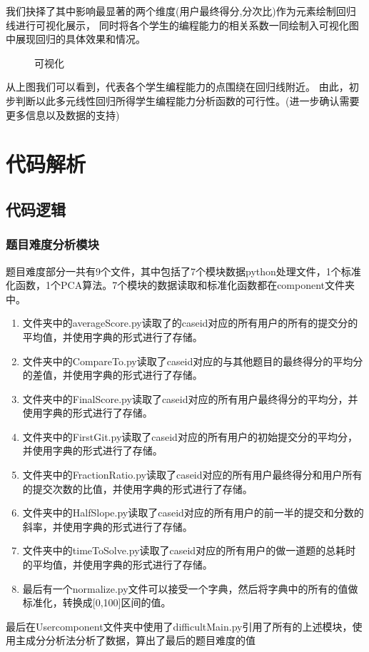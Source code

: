 \documentclass[UTF8]{ctexart}
\begin{document}
我们抉择了其中影响最显著的两个维度(用户最终得分,分次比)作为元素绘制回归线进行可视化展示，
同时将各个学生的编程能力的相关系数一同绘制入可视化图中展现回归的具体效果和情况。

\begin{figure}[htb] 
\caption{\label{1} 可视化} 
\end{figure}

从上图我们可以看到，代表各个学生编程能力的点围绕在回归线附近。
由此，初步判断以此多元线性回归所得学生编程能力分析函数的可行性。(进一步确认需要更多信息以及数据的支持)
\section{代码解析}
\subsection{代码逻辑}
\subsubsection{题目难度分析模块}
题目难度部分一共有9个文件，其中包括了7个模块数据python处理文件，1个标准化函数，1个PCA算法。7个模块的数据读取和标准化函数都在component文件夹中。

\begin{enumerate}[(1)]

    \item 文件夹中的averageScore.py读取了的caseid对应的所有用户的所有的提交分的平均值，并使用字典的形式进行了存储。
    \item 文件夹中的CompareTo.py读取了caseid对应的与其他题目的最终得分的平均分的差值，并使用字典的形式进行了存储。
    \item 文件夹中的FinalScore.py读取了caseid对应的所有用户最终得分的平均分，并使用字典的形式进行了存储。
    \item 文件夹中的FirstGit.py读取了caseid对应的所有用户的初始提交分的平均分，并使用字典的形式进行了存储。
    \item 文件夹中的FractionRatio.py读取了caseid对应的所有用户最终得分和用户所有的提交次数的比值，并使用字典的形式进行了存储。
    \item 文件夹中的HalfSlope.py读取了caseid对应的所有用户的前一半的提交和分数的斜率，并使用字典的形式进行了存储。
    \item 文件夹中的timeToSolve.py读取了caseid对应的所有用户的做一道题的总耗时的平均值，并使用字典的形式进行了存储。
    \item 最后有一个normalize.py文件可以接受一个字典，然后将字典中的所有的值做标准化，转换成[0,100]区间的值。

\end{enumerate}
最后在Usercomponent文件夹中使用了difficultMain.py引用了所有的上述模块，使用主成分分析法分析了数据，算出了最后的题目难度的值
\end{document}
